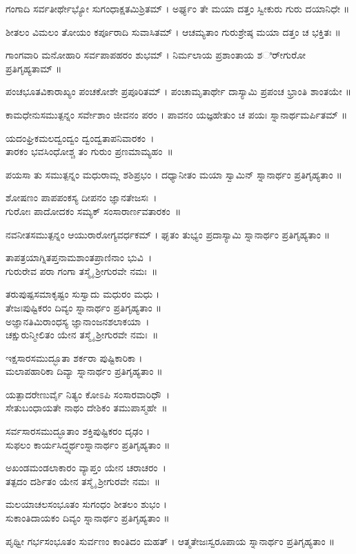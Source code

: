 ಗಂಗಾದಿ ಸರ್ವತೀರ್ಥೇಭ್ಯೋ ಸುಗಂಧಾಕ್ಷತಮಿಶ್ರಿತಮ್ ।
ಅರ್ಘ್ಯಂ ತೇ ಮಯಾ ದತ್ತಂ ಸ್ವೀಕುರು ಗುರು ದಯಾನಿಧೇ ॥

ಶೀತಲಂ ವಿಮಲಂ ತೋಯಂ ಕರ್ಪೂರಾದಿ ಸುವಾಸಿತಮ್ ।
ಆಚಮ್ಯತಾಂ ಗುರುಶ್ರೇಷ್ಠ ಮಯಾ ದತ್ತಂ ಚ ಭಕ್ತಿತಃ ॥

ಗಾಂಗವಾರಿ ಮನೋಹಾರಿ ಸರ್ವಪಾಪಹರಂ ಶುಭಮ್ ।
ನಿರ್ಮಲಾಯ ಪ್ರಶಾಂತಾಯ ಶರ್ೀಗುರೋ ಪ್ರತಿಗೃಹ್ಯತಾಮ್ ॥

ಪಂಚಭೂತವಿಕಾರಾಖ್ಯಂ ಪಂಚಕೋಶೇ ಪ್ರಪೂರಿತಮ್ ।
ಪಂಚಾಮೃತಾರ್ಥೇ ದಾಸ್ಯಾಮಿ ಪ್ರಪಂಚ ಭ್ರಾಂತಿ ಶಾಂತಯೇ ॥

ಕಾಮಧೇನುಸಮುತ್ಪನ್ನಂ ಸರ್ವೇಶಾಂ ಜೀವನಂ ಪರಂ ।
ಪಾವನಂ ಯಜ್ಞಹೇತುಂ ಚ ಪಯಃ ಸ್ನಾನಾರ್ಥಮರ್ಪಿತಮ್ ॥

ಯದಂಘ್ರಿಕಮಲದ್ವಂದ್ವಂ ದ್ವಂದ್ವತಾಪನಿವಾರಕಂ~।\\
ತಾರಕಂ ಭವಸಿಂಧೋಶ್ಚ ತಂ ಗುರುಂ ಪ್ರಣಮಾಮ್ಯಹಂ~॥

ಪಯಸಾ ತು ಸಮುತ್ಪನ್ನಂ ಮಧುರಾಮ್ಲ ಶಶಿಪ್ರಭಂ ।
ದಧ್ಯಾನೀತಂ ಮಯಾ ಸ್ವಾಮಿನ್ ಸ್ನಾನಾರ್ಥಂ ಪ್ರತಿಗೃಹ್ಯತಾಂ ॥

ಶೋಷಣಂ ಪಾಪಪಂಕಸ್ಯ ದೀಪನಂ ಜ್ಞಾನತೇಜಸಃ~।\\
ಗುರೋಃ ಪಾದೋದಕಂ ಸಮ್ಯಕ್ ಸಂಸಾರಾರ್ಣವತಾರಕಂ~॥

ನವನೀತಸಮುತ್ಪನ್ನಂ ಆಯುರಾರೋಗ್ಯವರ್ಧಕಮ್ ।
ಘೃತಂ ತುಭ್ಯಂ ಪ್ರದಾಸ್ಯಾಮಿ ಸ್ನಾನಾರ್ಥಂ ಪ್ರತಿಗೃಹ್ಯತಾಂ ॥

ತಾಪತ್ರಯಾಗ್ನಿತಪ್ತನಾಮಶಾಂತಪ್ರಾಣಿನಾಂ ಭುವಿ~।\\
ಗುರುರೇವ ಪರಾ ಗಂಗಾ ತಸ್ಮೈ ಶ್ರೀಗುರವೇ ನಮಃ~॥

ತರುಪುಷ್ಪಸಮಾಕೃಷ್ಟಂ ಸುಸ್ವಾದು ಮಧುರಂ ಮಧು ।\\
ತೇಜಃಪುಷ್ಟಿಕರಂ ದಿವ್ಯಂ ಸ್ನಾನಾರ್ಥಂ ಪ್ರತಿಗೃಹ್ಯತಾಂ ॥ \\

ಅಜ್ಞಾನತಿಮಿರಾಂಧಸ್ಯ ಜ್ಞಾನಾಂಜನಶಲಾಕಯಾ~।\\
ಚಕ್ಷುರುನ್ಮೀಲಿತಂ ಯೇನ ತಸ್ಮೈ ಶ್ರೀಗುರವೇ ನಮಃ~॥

ಇಕ್ಷಸಾರಸಮುದ್ಭೂತಾ ಶರ್ಕರಾ ಪುಷ್ಟಿಕಾರಿಕಾ ।\\
ಮಲಾಪಹಾರಿಕಾ ದಿವ್ಯಾ ಸ್ನಾನಾರ್ಥಂ ಪ್ರತಿಗೃಹ್ಯತಾಂ ॥

ಯತ್ಪಾದರೇಣುರ್ವೈ ನಿತ್ಯಂ ಕೋಽಪಿ ಸಂಸಾರವಾರಿಧೌ~।\\
ಸೇತುಬಂಧಾಯತೇ ನಾಥಂ ದೇಶಿಕಂ ತಮುಪಾಸ್ಮಹೇ~॥

ಸರ್ವಸಾರಸಮುದ್ಭೂತಾಂ ಶಕ್ತಿಪುಷ್ಟಿಕರಂ ದೃಢಂ ।\\
ಸುಫಲಂ ಕಾರ್ಯಸಿದ್ಧ್ಯರ್ಥಂಸ್ನಾನಾರ್ಥಂ ಪ್ರತಿಗೃಹ್ಯತಾಂ ॥

ಅಖಂಡಮಂಡಲಾಕಾರಂ ವ್ಯಾಪ್ತಂ ಯೇನ ಚರಾಚರಂ~।\\
ತತ್ಪದಂ ದರ್ಶಿತಂ ಯೇನ ತಸ್ಮೈ ಶ್ರೀಗುರವೇ ನಮಃ~॥

ಮಲಯಾಚಲಸಂಭೂತಂ ಸುಗಂಧಂ ಶೀತಲಂ ಶುಭಂ ।\\
ಸುಕಾಂತಿದಾಯಕಂ ದಿವ್ಯಂ ಸ್ನಾನಾರ್ಥಂ ಪ್ರತಿಗೃಹ್ಯತಾಂ ॥


ಪೃಥ್ವೀ ಗರ್ಭಸಂಭೂತಂ ಸುರ್ವಣಂ ಕಾಂತಿದಂ ಮಹತ್ ।
ಆತ್ಮತೇಜಃಸ್ವರೂಪಾಯ  ಸ್ನಾನಾರ್ಥಂ ಪ್ರತಿಗೃಹ್ಯತಾಂ ॥

